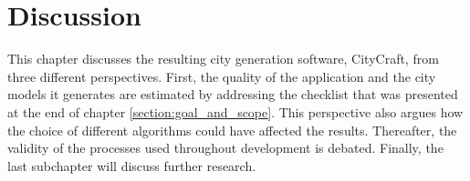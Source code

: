 \chapter{Discussion}

This chapter discusses the resulting city generation software, CityCraft, from three different perspectives.
First, the quality of the application and the city models it generates are estimated by addressing the checklist that was presented at the end of chapter \ref{section:goal_and_scope}.
This perspective also argues how the choice of different algorithms could have affected the results.
Thereafter, the validity of the processes used throughout development is debated.
Finally, the last subchapter will discuss further research.




